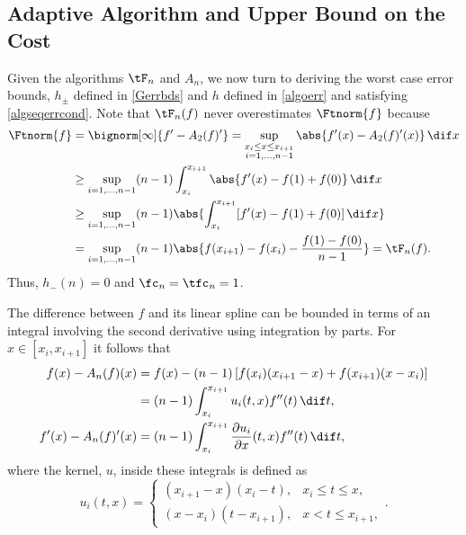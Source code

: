 \subsection{Adaptive Algorithm and Upper Bound on the Cost}

Given the algorithms $\tF_n$ and $A_n$, we now turn to deriving the worst case error bounds, $h_{\pm}$ defined in \eqref{Gerrbds} and $h$ defined in \eqref{algoerr} and satisfying \eqref{algseqerrcond}.  
Note that $\tF_{n}(f)$ never overestimates $\Ftnorm{f}$ because 
\begin{align*}
\Ftnorm{f} &  = \bignorm[\infty]{f'-A_2(f)'} 
= \sup_{\substack{x_i \le x \le x_{i+1}\\ i=1, \ldots, n-1 }} \abs{f'(x) - A_2(f)'(x)} \, \dif x \\
&\ge \sup_{i=1, \ldots, n-1} (n-1)\int_{x_i}^{x_{i+1}} \abs{f'(x) - f(1)+f(0)} \, \dif x \\
&\ge \sup_{i=1, \ldots, n-1} (n-1)\abs{\int_{x_i}^{x_{i+1}} [f'(x) - f(1)+f(0)] \, \dif x }\\
&= \sup_{i=1, \ldots, n-1} (n-1)\abs{f(x_{i+1})-f(x_i) - \frac{f(1)-f(0)}{n-1}} = \tF_n(f).
\end{align*}
Thus, $h_{-}(n)=0$ and $\fc_n=\tfc_n=1$. 

The difference between $f$ and its linear spline can be bounded in terms of an integral involving the second derivative using integration by parts.  For $x \in [x_i,x_{i+1}]$ it follows that 
\begin{align}
\nonumber
f(x)-A_n (f)(x)
&= f(x) - (n-1) \left[f(x_{i})(x_{i+1}-x) +f(x_{i+1})(x-x_i) \right]\\
& = (n-1) \int_{x_i}^{x_{i+1}} u_i(t,x) f''(t) \, \dif t, \label{fintermsfdoubprime}\\
f'(x)-A_n(f)'(x) & = (n-1) \int_{x_i}^{x_{i+1}} \frac{\partial u_i}{\partial x}(t,x) f''(t) \, \dif t, \label{fprimeintermsfdoubprime}
\end{align}
where the kernel, $u$, inside these integrals is defined as
\begin{equation*}
u_i(t,x) =\begin{cases} (x_{i+1}-x)(x_i-t), & x_i\leq t\leq x,\\
(x-x_{i})(t- x_{i+1}), & x< t \leq x_{i+1},
\end{cases}.
\end{equation*}

